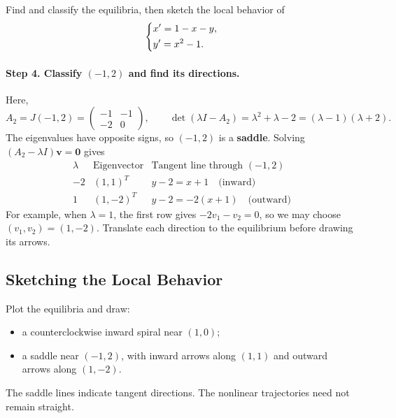 \documentclass[10pt,letterpaper]{article}
\begin{document}
\begin{example}[1]{
Find and classify the equilibria, then sketch the
local behavior of
\[
\begin{dcases}
x'=1-x-y,\\
y'=x^2-1.
\end{dcases}
\]
}
\paragraph{Step 4. Classify $(-1,2)$ and find its directions.}
Here,
\[
A_2=J(-1,2)=\begin{pmatrix}-1&-1\\-2&0\end{pmatrix},
\qquad
\det(\lambda I-A_2)=\lambda^2+\lambda-2
=(\lambda-1)(\lambda+2).
\]
The eigenvalues have opposite signs, so $(-1,2)$ is a \textbf{saddle}.
Solving $(A_2-\lambda I)\mathbf v=\mathbf0$ gives
\[
\begin{array}{c|c|c}
\lambda & \text{Eigenvector} & \text{Tangent line through }(-1,2)\\\hline
-2 & (1,1)^T & y-2=x+1\quad\text{(inward)}\\
1 & (1,-2)^T & y-2=-2(x+1)\quad\text{(outward)}
\end{array}
\]
For example, when $\lambda=1$, the first row gives
$-2v_1-v_2=0$, so we may choose $(v_1,v_2)=(1,-2)$.
Translate each direction to the equilibrium before drawing its arrows.
\end{example}

\subsection{Sketching the Local Behavior}

Plot the equilibria and draw:
\begin{itemize}
    \item a counterclockwise inward spiral near $(1,0)$;
    \item a saddle near $(-1,2)$, with inward arrows
    along $(1,1)$ and outward arrows along $(1,-2)$.
\end{itemize}

The saddle lines indicate tangent directions.
The nonlinear trajectories need not remain straight.
\end{document}
